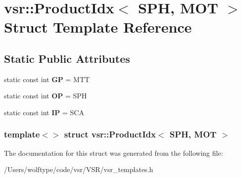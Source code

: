\hypertarget{structvsr_1_1_product_idx_3_01_s_p_h_00_01_m_o_t_01_4}{\section{vsr\-:\-:Product\-Idx$<$ S\-P\-H, M\-O\-T $>$ Struct Template Reference}
\label{structvsr_1_1_product_idx_3_01_s_p_h_00_01_m_o_t_01_4}
}
\subsection*{Static Public Attributes}
\begin{DoxyCompactItemize}
\item 
\hypertarget{structvsr_1_1_product_idx_3_01_s_p_h_00_01_m_o_t_01_4_aad60b0c0b29ded8c6bd8cc9d8e43d632}{static const int {\bfseries G\-P} = M\-T\-T}\label{structvsr_1_1_product_idx_3_01_s_p_h_00_01_m_o_t_01_4_aad60b0c0b29ded8c6bd8cc9d8e43d632}

\item 
\hypertarget{structvsr_1_1_product_idx_3_01_s_p_h_00_01_m_o_t_01_4_ae5d6cc4a7b01374ef514d222f2376847}{static const int {\bfseries O\-P} = S\-P\-H}\label{structvsr_1_1_product_idx_3_01_s_p_h_00_01_m_o_t_01_4_ae5d6cc4a7b01374ef514d222f2376847}

\item 
\hypertarget{structvsr_1_1_product_idx_3_01_s_p_h_00_01_m_o_t_01_4_a5b03e494fa091cccc5c5d6ade8e06b73}{static const int {\bfseries I\-P} = S\-C\-A}\label{structvsr_1_1_product_idx_3_01_s_p_h_00_01_m_o_t_01_4_a5b03e494fa091cccc5c5d6ade8e06b73}

\end{DoxyCompactItemize}
\subsubsection*{template$<$$>$ struct vsr\-::\-Product\-Idx$<$ S\-P\-H, M\-O\-T $>$}



The documentation for this struct was generated from the following file\-:\begin{DoxyCompactItemize}
\item 
/\-Users/wolftype/code/vsr/\-V\-S\-R/vsr\-\_\-templates.\-h\end{DoxyCompactItemize}
